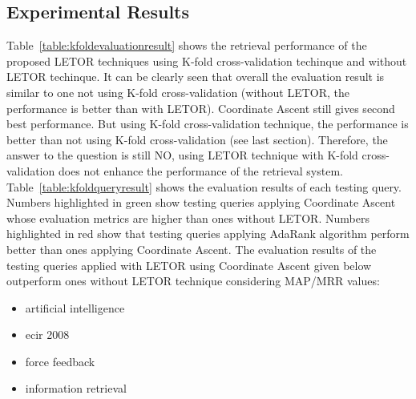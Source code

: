 \subsection{Experimental Results}

Table~\ref{table:kfoldevaluationresult} shows the retrieval performance of the proposed LETOR techniques using K-fold cross-validation techinque
and without LETOR techinque.
It can be clearly seen that overall the evaluation result is similar to one not using K-fold cross-validation (without LETOR, the performance is better than
with LETOR). Coordinate Ascent still gives second best performance. But using K-fold cross-validation technique, the performance is better than
not using K-fold cross-validation (see last section). Therefore, the answer
to the question is still NO, using LETOR technique with K-fold cross-validation does not enhance the performance of the retrieval system.
Table~\ref{table:kfoldqueryresult} shows the evaluation results of each testing query. Numbers highlighted in green show testing queries applying Coordinate Ascent 
whose evaluation metrics are higher
than ones without LETOR. Numbers highlighted in red show that testing queries applying AdaRank algorithm perform better than ones applying Coordinate Ascent.
The evaluation results of the testing queries applied with LETOR using Coordinate Ascent given below outperform ones without LETOR technique considering MAP/MRR values:
\begin{itemize}
 \item artificial intelligence
 \item ecir 2008
 \item force feedback
 \item information retrieval
\end{itemize}


\begin{table}
\centering
{}
\caption{Evaluation Results Using K-fold Cross-validation} \label{table:kfoldevaluationresult}
\end{table}

